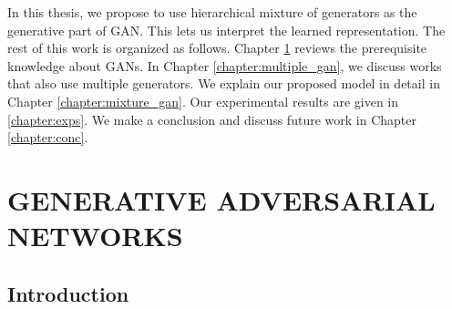 \documentclass[a4paper,onesided,12pt]{report}
\begin{document}
In this thesis, we propose to use hierarchical mixture of generators as the generative part of GAN. This lets us interpret the learned representation. The rest of this work is organized as follows. Chapter \ref{chapter:gan} reviews the prerequisite knowledge about GANs. In Chapter \ref{chapter:multiple_gan}, we discuss works that also use multiple generators. We explain our proposed model in detail in Chapter \ref{chapter:mixture_gan}. Our experimental results are given in \ref{chapter:exps}. We make a conclusion and discuss future work in Chapter \ref{chapter:conc}.

\chapter{GENERATIVE ADVERSARIAL NETWORKS}
\label{chapter:gan}

\section{Introduction}
\label{sec:gan:intro}
\end{document}
